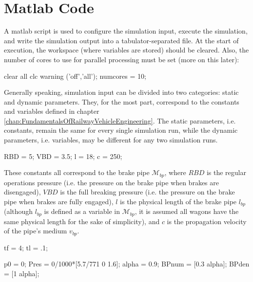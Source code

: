\section{Matlab Code}
\label{sec:MatlabCode}
\par\noindent
A matlab script is used to configure the simulation input, execute the simulation, and write the simulation output into a tabulator-separated file. At the start of execution, the workspace (where variables are stored) should be cleared. Also, the number of cores to use for parallel processing must be set (more on this later):

\bigskip
\begin{python}
clear all
clc
warning ('off','all');
numcores = 10;
\end{python}
\bigskip

\noindent
Generally speaking, simulation input can be divided into two categories: static and dynamic parameters. They, for the most part, correspond to the constants and variables defined in chapter \ref{chap:FundamentalsOfRailwayVehicleEngineering}. The static parameters, i.e. constants, remain the same for every single simulation run, while the dynamic parameters, i.e. variables, may be different for any two simulation runs.

\bigskip
\begin{python}
RBD = 5; 
VBD = 3.5; 
l = 18; 
c = 250; 
\end{python}
\bigskip

\noindent
These constants all correspond to the brake pipe ${\mathcal{M}}_{bp}$, where $RBD$ is the regular operations pressure (i.e. the pressure on the brake pipe when brakes are disengaged), $VBD$ is the full breaking pressure (i.e. the pressure on the brake pipe when brakes are fully engaged), $l$ is the physical length of the brake pipe $l_{bp}$ (although $l_{bp}$ is defined as a variable in ${\mathcal{M}}_{bp}$, it is assumed all wagons have the same physical length for the sake of simplicity), and $c$ is the propagation velocity of the pipe's medium $v_{bp}$.

\bigskip
\begin{python}
tf = 4;
tl = .1;
\end{python}
\bigskip

\noindent
\TODO{}

\bigskip
\begin{python}
p0 = 0;
Pres = 0/1000*[5.7/771 0 1.6];
alpha = 0.9;
BPnum = [0.3 alpha];
BPden = [1 alpha];
\end{python}
\bigskip

